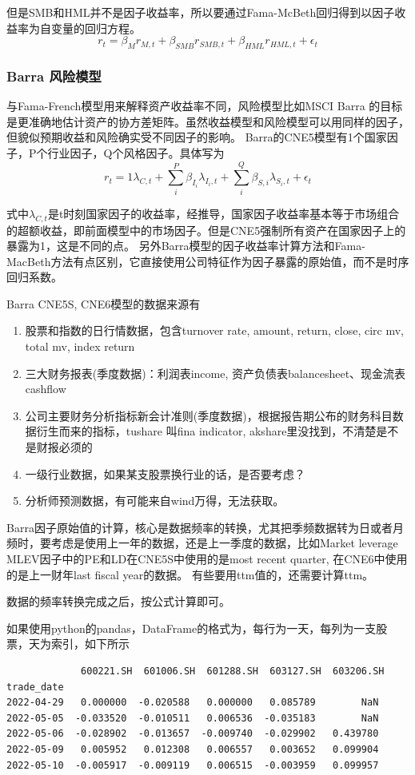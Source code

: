 \documentclass[11pt,oneside,a4paper,notitlepage]{article}
\begin{document}
\begin{CJK}{UTF8}{gbsn}
但是SMB和HML并不是因子收益率，所以要通过Fama-McBeth回归得到以因子收益率为自变量的回归方程。
$$r_t = \beta_M r_{M,t} + \beta_{SMB}r_{SMB,t} + \beta_{HML} r_{HML,t} + \epsilon_t$$

\subsubsection{Barra 风险模型}
与Fama-French模型用来解释资产收益率不同，风险模型比如MSCI Barra 的目标是更准确地估计资产的协方差矩阵。虽然收益模型和风险模型可以用同样的因子，但貌似预期收益和风险确实受不同因子的影响。
Barra的CNE5模型有1个国家因子，P个行业因子，Q个风格因子。具体写为
  $$r_t = 1\lambda_{C,t} + \sum_i^P{\beta_{I_i}\lambda_{I_i, t}} + \sum_i^Q{\beta_{S,i}\lambda_{S_i, t}} +\epsilon_t $$

式中$\lambda_{C,t}$是t时刻国家因子的收益率，经推导，国家因子收益率基本等于市场组合的超额收益，即前面模型中的市场因子。但是CNE5强制所有资产在国家因子上的暴露为1，这是不同的点。
另外Barra模型的因子收益率计算方法和Fama-MacBeth方法有点区别，它直接使用公司特征作为因子暴露的原始值，而不是时序回归系数。


Barra CNE5S, CNE6模型的数据来源有
\begin{enumerate}
\item 股票和指数的日行情数据，包含turnover rate, amount, return, close, circ mv, total mv, index return 
\item 三大财务报表(季度数据)：利润表income, 资产负债表balancesheet、现金流表cashflow
\item 公司主要财务分析指标新会计准则(季度数据)，根据报告期公布的财务科目数据衍生而来的指标，tushare 叫fina indicator, akshare里没找到，不清楚是不是财报必须的
\item 一级行业数据，如果某支股票换行业的话，是否要考虑？
\item 分析师预测数据，有可能来自wind万得，无法获取。
\end{enumerate}

Barra因子原始值的计算，核心是数据频率的转换，尤其把季频数据转为日或者月频时，要考虑是使用上一年的数据，还是上一季度的数据，比如Market leverage MLEV因子中的PE和LD在CNE5S中使用的是most recent quarter, 在CNE6中使用的是上一财年last fiscal year的数据。 有些要用ttm值的，还需要计算ttm。

数据的频率转换完成之后，按公式计算即可。

如果使用python的pandas，DataFrame的格式为，每行为一天，每列为一支股票，天为索引，如下所示
\begin{verbatim}
             600221.SH  601006.SH  601288.SH  603127.SH  603206.SH
trade_date                                                       
2022-04-29   0.000000  -0.020588   0.000000   0.085789        NaN
2022-05-05  -0.033520  -0.010511   0.006536  -0.035183        NaN
2022-05-06  -0.028902  -0.013657  -0.009740  -0.029902   0.439780
2022-05-09   0.005952   0.012308   0.006557   0.003652   0.099904
2022-05-10  -0.005917  -0.009119   0.006515  -0.003959   0.099957
\end{verbatim}


\end{CJK}
\end{document}
